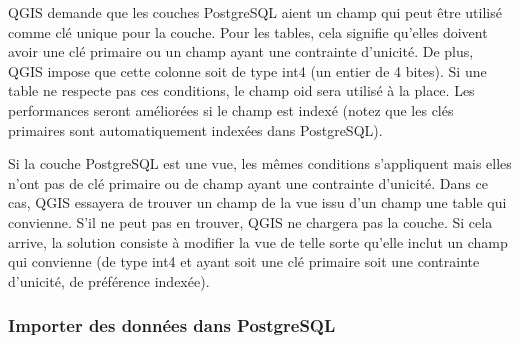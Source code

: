 QGIS demande que les couches PostgreSQL aient un champ qui peut être utilisé comme clé unique pour la couche. Pour les tables, cela signifie qu'elles doivent avoir une clé primaire ou un champ ayant une contrainte d'unicité. De plus, QGIS impose que cette colonne soit de type int4 (un entier de 4 bites). Si une table ne respecte pas ces conditions, le champ oid sera utilisé à la place. Les performances seront améliorées si le champ est indexé (notez que les clés primaires sont automatiquement indexées dans PostgreSQL).

Si la couche PostgreSQL est une vue, les mêmes conditions s'appliquent mais elles n'ont pas de clé primaire ou de champ ayant une contrainte d'unicité. Dans ce cas, QGIS essayera de trouver un champ de la vue issu d'un champ une table qui convienne. S'il ne peut pas en trouver, QGIS ne chargera pas la couche. Si cela arrive, la solution consiste à modifier la vue de telle sorte qu'elle inclut un champ qui convienne (de type int4 et ayant soit une clé primaire soit une contrainte d'unicité, de préférence indexée).

\subsubsection{Importer des données dans PostgreSQL}\label{sec:loading_postgis_data}

